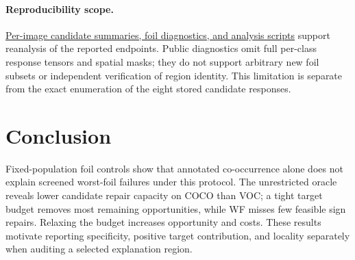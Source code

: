 \documentclass[10pt]{article}
\begin{document}
\paragraph{Reproducibility scope.}
\href{https://github.com/jovial-liu/conway/tree/paper/verified-rerun-integration/experiments}{Per-image candidate summaries, foil diagnostics, and analysis scripts} support
reanalysis of the reported endpoints. Public diagnostics omit full per-class
response tensors and spatial masks; they do not support arbitrary new foil
subsets or independent verification of region identity. This limitation is
separate from the exact enumeration of the eight stored candidate responses.

\section{Conclusion}
Fixed-population foil controls show that annotated co-occurrence alone does
not explain screened worst-foil failures under this protocol. The unrestricted
oracle reveals lower candidate repair capacity on COCO than VOC; a tight
target budget removes most remaining opportunities, while WF misses few
feasible sign repairs. Relaxing the budget increases opportunity and costs.
These results motivate reporting specificity, positive target contribution,
and locality separately when auditing a selected explanation region.

\clearpage

\end{document}
